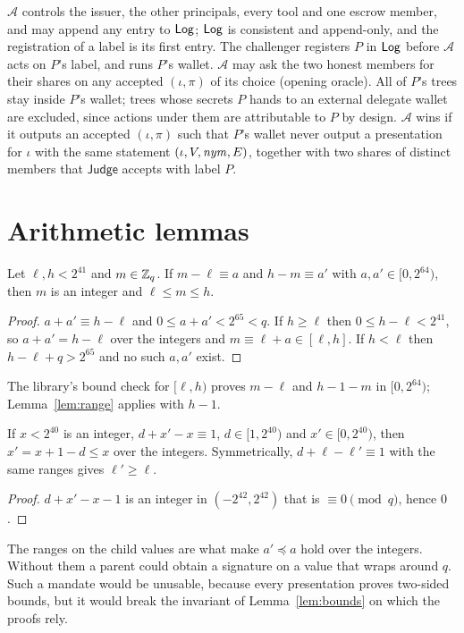 \begin{definition}[NF]\label{def:nf}
$\mathcal{A}$ controls the issuer, the other principals, every tool and one escrow member, and may append any entry to $\mathsf{Log}$; $\mathsf{Log}$ is consistent and append-only, and the registration of a label is its first entry. The challenger registers $P$ in $\mathsf{Log}$ before $\mathcal{A}$ acts on $P$'s label, and runs $P$'s wallet. $\mathcal{A}$ may ask the two honest members for their shares on any accepted $(\iota,\pi)$ of its choice (opening oracle). All of $P$'s trees stay inside $P$'s wallet; trees whose secrets $P$ hands to an external delegate wallet are excluded, since actions under them are attributable to $P$ by design. $\mathcal{A}$ wins if it outputs an accepted $(\iota,\pi)$ such that $P$'s wallet never output a presentation for $\iota$ with the same statement $(\iota,V,\mathit{nym},E)$, together with two shares of distinct members that $\mathsf{Judge}$ accepts with label $P$.
\end{definition}

\section{Arithmetic lemmas}\label{s:lemmas}
\begin{lemma}\label{lem:range}
Let $\ell,h<2^{41}$ and $m\in\mathbb{Z}_q$. If $m-\ell\equiv a$ and $h-m\equiv a'$ with $a,a'\in[0,2^{64})$, then $m$ is an integer and $\ell\le m\le h$.
\end{lemma}
\begin{proof}
$a+a'\equiv h-\ell$ and $0\le a+a'<2^{65}<q$. If $h\ge\ell$ then $0\le h-\ell<2^{41}$, so $a+a'=h-\ell$ over the integers and $m\equiv\ell+a\in[\ell,h]$. If $h<\ell$ then $h-\ell+q>2^{65}$ and no such $a,a'$ exist.
\end{proof}
The library's bound check for $[\ell,h)$ proves $m-\ell$ and $h-1-m$ in $[0,2^{64})$; Lemma~\ref{lem:range} applies with $h-1$.

\begin{lemma}\label{lem:att}
If $x<2^{40}$ is an integer, $d+x'-x\equiv1$, $d\in[1,2^{40})$ and $x'\in[0,2^{40})$, then $x'=x+1-d\le x$ over the integers. Symmetrically, $d+\ell-\ell'\equiv1$ with the same ranges gives $\ell'\ge\ell$.
\end{lemma}
\begin{proof}
$d+x'-x-1$ is an integer in $(-2^{42},2^{42})$ that is $\equiv0\pmod q$, hence $0$.
\end{proof}
The ranges on the child values are what make $a'\preceq a$ hold over the integers. Without them a parent could obtain a signature on a value that wraps around $q$. Such a mandate would be unusable, because every presentation proves two-sided bounds, but it would break the invariant of Lemma~\ref{lem:bounds} on which the proofs rely.

